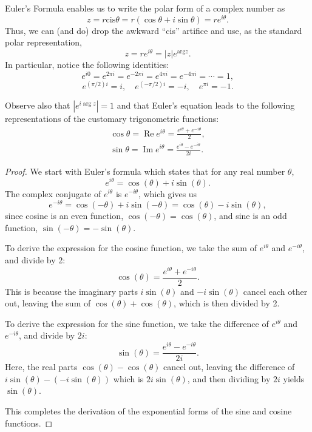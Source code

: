 \documentclass[
	12pt, %
	fleqn, %
	a4paper, %
]{LegrandOrangeBook}
\begin{document}
Euler's Formula enables us to write the polar form of a complex number as
\[
z = r \text{cis} \theta = r(\cos \theta + i \sin \theta) = r e^{i\theta}.
\]
Thus, we can (and do) drop the awkward ``cis'' artifice and use, as the standard polar representation,
\[
z = r e^{i\theta} = \lvert z \rvert e^{\text{arg} z}.
\]
In particular, notice the following identities:
\[
e^{i0} = e^{2\pi i} = e^{-2\pi i} = e^{4\pi i} = e^{-4\pi i} = \cdots = 1,
\]
\[
e^{(\pi/2)i} = i, \quad e^{(-\pi/2)i} = -i, \quad e^{\pi i} = -1.
\]

Observe also that  $\left|e^{i \arg z}\right|=1$  and that Euler's equation leads to the following representations of the customary trigonometric functions:
$$\begin{array}{l}
    \cos \theta=\operatorname{Re} e^{i \theta}=\frac{e^{i \theta}+e^{-i \theta}}{2}, \\
    \sin \theta=\operatorname{Im} e^{i \theta}=\frac{e^{i \theta}-e^{-i \theta}}{2 i} .
    \end{array}$$

\begin{proof}
    We start with Euler's formula which states that for any real number \( \theta \),
\begin{equation}
    e^{i\theta} = \cos(\theta) + i\sin(\theta).
\end{equation}
The complex conjugate of \( e^{i\theta} \) is \( e^{-i\theta} \), which gives us
\begin{equation}
    e^{-i\theta} = \cos(-\theta) + i\sin(-\theta) = \cos(\theta) - i\sin(\theta),
\end{equation}
since cosine is an even function, \( \cos(-\theta) = \cos(\theta) \), and sine is an odd function, \( \sin(-\theta) = -\sin(\theta) \).

To derive the expression for the cosine function, we take the sum of \( e^{i\theta} \) and \( e^{-i\theta} \), and divide by 2:
\begin{equation}
    \cos(\theta) = \frac{e^{i\theta} + e^{-i\theta}}{2}.
\end{equation}
This is because the imaginary parts \( i\sin(\theta) \) and \( -i\sin(\theta) \) cancel each other out, leaving the sum of \( \cos(\theta) + \cos(\theta) \), which is then divided by 2.

To derive the expression for the sine function, we take the difference of \( e^{i\theta} \) and \( e^{-i\theta} \), and divide by \( 2i \):
\begin{equation}
    \sin(\theta) = \frac{e^{i\theta} - e^{-i\theta}}{2i}.
\end{equation}
Here, the real parts \( \cos(\theta) - \cos(\theta) \) cancel out, leaving the difference of \( i\sin(\theta) - (-i\sin(\theta)) \) which is \( 2i\sin(\theta) \), and then dividing by \( 2i \) yields \( \sin(\theta) \).

This completes the derivation of the exponential forms of the sine and cosine functions.
\end{proof}
\end{document}
